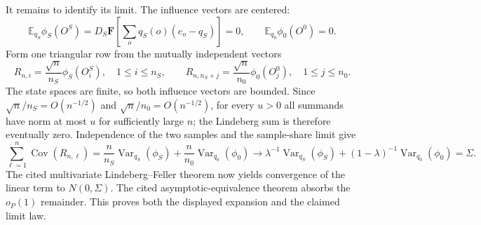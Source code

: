 It remains to identify its limit.  The influence vectors are centered:
\[
\mathbb E_{q_S}\phi_S(O^S)
=D_S\mathbf F\!\left[\sum_o q_S(o)(e_o-q_S)\right]=0,
\qquad
\mathbb E_{q_0}\phi_0(O^0)=0.
\]
Form one triangular row from the mutually independent vectors
\[
R_{n,i}=\frac{\sqrt n}{n_S}\phi_S(O_i^S),
\quad 1\le i\le n_S,
\qquad
R_{n,n_S+j}=\frac{\sqrt n}{n_0}\phi_0(O_j^0),
\quad 1\le j\le n_0.
\]
The state spaces are finite, so both influence vectors are bounded.  Since \(\sqrt n/n_S=O(n^{-1/2})\) and \(\sqrt n/n_0=O(n^{-1/2})\), for every \(u>0\) all summands have norm at most \(u\) for sufficiently large \(n\); the Lindeberg sum is therefore eventually zero.  Independence of the two samples and the sample-share limit give
\[
\sum_{\ell=1}^{n}\operatorname{Cov}(R_{n,\ell})
=\frac n{n_S}\operatorname{Var}_{q_S}(\phi_S)
+\frac n{n_0}\operatorname{Var}_{q_0}(\phi_0)
\longrightarrow
\lambda^{-1}\operatorname{Var}_{q_S}(\phi_S)
+(1-\lambda)^{-1}\operatorname{Var}_{q_0}(\phi_0)
=\Sigma.
\]
The cited multivariate Lindeberg--Feller theorem now yields convergence of the linear term to \(N(0,\Sigma)\).  The cited asymptotic-equivalence theorem absorbs the \(o_P(1)\) remainder.  This proves both the displayed expansion and the claimed limit law.